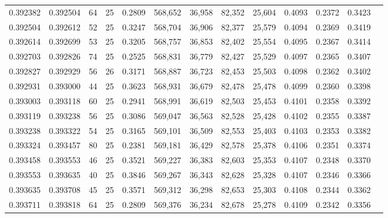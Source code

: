 \begin{tabular}{rrrrrrrrrrrrr}
0.392382 & 0.392504 &    64 &  25 &                                     0.2809 & 568,652 &  36,958 &  82,352 &  25,604 & 0.4093 & 0.2372 & 0.3423 \\
0.392504 & 0.392612 &    52 &  25 &                                     0.3247 & 568,704 &  36,906 &  82,377 &  25,579 & 0.4094 & 0.2369 & 0.3419 \\
0.392614 & 0.392699 &    53 &  25 &                                     0.3205 & 568,757 &  36,853 &  82,402 &  25,554 & 0.4095 & 0.2367 & 0.3414 \\
0.392703 & 0.392826 &    74 &  25 &                                     0.2525 & 568,831 &  36,779 &  82,427 &  25,529 & 0.4097 & 0.2365 & 0.3407 \\
0.392827 & 0.392929 &    56 &  26 &                                     0.3171 & 568,887 &  36,723 &  82,453 &  25,503 & 0.4098 & 0.2362 & 0.3402 \\
0.392931 & 0.393000 &    44 &  25 &                                     0.3623 & 568,931 &  36,679 &  82,478 &  25,478 & 0.4099 & 0.2360 & 0.3398 \\
0.393003 & 0.393118 &    60 &  25 &                                     0.2941 & 568,991 &  36,619 &  82,503 &  25,453 & 0.4101 & 0.2358 & 0.3392 \\
0.393119 & 0.393238 &    56 &  25 &                                     0.3086 & 569,047 &  36,563 &  82,528 &  25,428 & 0.4102 & 0.2355 & 0.3387 \\
0.393238 & 0.393322 &    54 &  25 &                                     0.3165 & 569,101 &  36,509 &  82,553 &  25,403 & 0.4103 & 0.2353 & 0.3382 \\
0.393324 & 0.393457 &    80 &  25 &                                     0.2381 & 569,181 &  36,429 &  82,578 &  25,378 & 0.4106 & 0.2351 & 0.3374 \\
0.393458 & 0.393553 &    46 &  25 &                                     0.3521 & 569,227 &  36,383 &  82,603 &  25,353 & 0.4107 & 0.2348 & 0.3370 \\
0.393553 & 0.393635 &    40 &  25 &                                     0.3846 & 569,267 &  36,343 &  82,628 &  25,328 & 0.4107 & 0.2346 & 0.3366 \\
0.393635 & 0.393708 &    45 &  25 &                                     0.3571 & 569,312 &  36,298 &  82,653 &  25,303 & 0.4108 & 0.2344 & 0.3362 \\
0.393711 & 0.393818 &    64 &  25 &                                     0.2809 & 569,376 &  36,234 &  82,678 &  25,278 & 0.4109 & 0.2342 & 0.3356 \\

\end{tabular}
